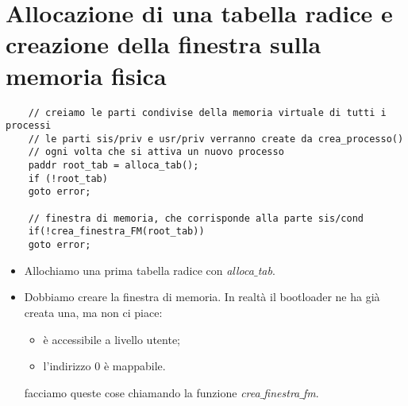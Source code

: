 \section{Allocazione di una tabella radice e creazione della finestra sulla memoria fisica}	
\small 
\begin{verbatim}
	// creiamo le parti condivise della memoria virtuale di tutti i processi
	// le parti sis/priv e usr/priv verranno create da crea_processo()
	// ogni volta che si attiva un nuovo processo
	paddr root_tab = alloca_tab();
	if (!root_tab)
	goto error;
	
	// finestra di memoria, che corrisponde alla parte sis/cond
	if(!crea_finestra_FM(root_tab))
	goto error;
\end{verbatim}
\normalsize 
\begin{itemize}
	\item Allochiamo una prima tabella radice con \emph{alloca$\_$tab}.
	\item Dobbiamo creare la finestra di memoria. In realtà il bootloader ne ha già creata una, ma non ci piace:
	\begin{itemize}
		\item è accessibile a livello utente;
		\item l'indirizzo $0$ è mappabile.
	\end{itemize}
	facciamo queste cose chiamando la funzione \emph{crea$\_$finestra$\_$fm}.
\end{itemize}

